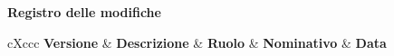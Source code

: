 \newpage

\begin{center}
	\Large{\textbf{Registro delle modifiche}}
	\\\vspace{0.5cm}
	\normalsize
	\begin{paddedtablex}[1.3]{\textwidth}{cXccc}
		\textbf{Versione} & \textbf{Descrizione} & \textbf{Ruolo} & \textbf{Nominativo} & \textbf{Data} \\\toprule
		\modifiche
		\bottomrule
	\end{paddedtablex}
\end{center}

\newpage
